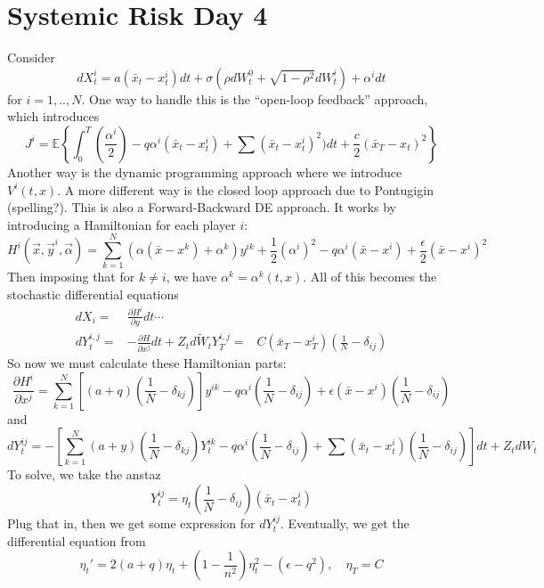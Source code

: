 \chapter{Systemic Risk Day 4}
Consider
\begin{equation}
	dX_t^i = a(\bar{x}_t-x_t^i)dt + \sigma(\rho dW_t^0 + \sqrt{1-\rho^2}dW_t^i) + \alpha^i dt
\end{equation}
for $i=1,..,N$. One way to handle this is the ``open-loop feedback'' approach, which introduces
\begin{equation}
	J^i = \mathbb{E}\left\{ \int_0^T (\frac{\alpha^i}{2}) - q \alpha^i(\bar{x}_t-x_t^i) + \sum (\bar{x}_t - x_t^i)^2 )dt  + \frac{c}{2}(\bar{x}_T - x_t)^2 \right\}
\end{equation}
Another way is the dynamic programming approach where we introduce $V^i(t,x)$.
A more different way is the closed loop approach due to Pontugigin (spelling?).
This is also a Forward-Backward DE approach. It works by introducing a Hamiltonian for each player $i$:
\begin{equation}
	H^i(\vec{x}, \vec{y}^i, \vec{\alpha}      )
	=
	\sum_{k=1}^N (\alpha(\bar{x} - x^k) + \alpha^k)y^{ik} + \frac{1}{2} (\alpha^i)^2 - q \alpha^i(\bar{x}-x^i) + \frac{\epsilon}{2}(\bar{x}-x^i)^2
\end{equation}
Then imposing that for $k\ne i$, we have $\alpha^k = \alpha^k(t,x)$.
All of this becomes the stochastic differential equations
\begin{align}
	dX_i =& \frac{\partial H^i}{\partial y} dt \cdots \\
	dY_t^{i,j}=& -\frac{\partial H}{\partial x^j} dt + Z_t d\tilde{W}_t
	Y_T^{i,j} =& C(\bar{x}_T-x^i_T)(\frac{1}{N} - \delta_{ij})
\end{align}
So now we must calculate these Hamiltonian parts:
\begin{equation}
	\frac{\partial H^i}{\partial x^j} = 
	 \sum_{k=1}^N \left[ (a+q)(\frac{1}{N} - \delta_{kj} ) \right] y^{ik}
	 -q\alpha^i(\frac{1}{N} - \delta_{ij})
	 + \epsilon(\bar{x} - x^i) (\frac{1}{N} - \delta_{ij})
\end{equation}
and
\begin{equation}
	dY^{ij}_t = -\left[ \sum_{k=1}^N (a+y)(\frac{1}{N} - \delta_{kj})Y_t^{ik} - q\alpha^i(\frac{1}{N} - \delta_{ij}) + \sum (\bar{x}_t - x_t^i)(\frac{1}{N}-\delta_{ij})\right] dt + Z_t dW_t
\end{equation}
To solve, we take the anstaz
\begin{equation}
	Y_t^{ij} = \eta_t(\frac{1}{N}-\delta_{ij})(\bar{x}_t - x^i_t)
\end{equation}
Plug that in, then we get some expression for $dY_t^{ij}$.
Eventually, we get the differential equation from
\begin{equation}
	\eta_t' = 2(a + q)\eta_t + (1-\frac{1}{n^2})\eta_t^2 - (\epsilon - q^2), \quad \eta_T=C
\end{equation}

